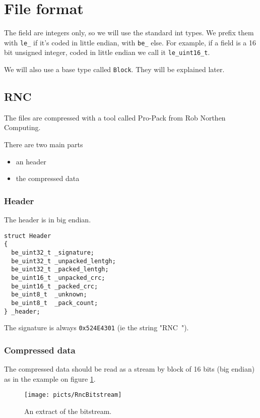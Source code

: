 \documentclass[a4paper,twoside,12pt,dvips]{article}
\begin{document}
\section{File format}
\label{sec:fileformat}

The field are integers only, so we will use the standard int types. We prefix them with \texttt{le\_} if it's coded in little endian, with \texttt{be\_} else. For example, if a field is a 16 bit unsigned integer, coded in little endian we call it \texttt{le\_uint16\_t}.

We will also use a base type called \texttt{Block}. They will be explained later. 

\subsection{RNC }
\label{sec:rnc}

The files are compressed with a tool called Pro-Pack from Rob Northen Computing.

There are two main parts 
\begin{itemize}
\item an header
\item the compressed data
\end{itemize}

\subsubsection{Header}
\label{sec:rnc_header}
The header is in big endian.

\begin{lstlisting}
struct Header
{
  be_uint32_t _signature;
  be_uint32_t _unpacked_lentgh;
  be_uint32_t _packed_lentgh;
  be_uint16_t _unpacked_crc;
  be_uint16_t _packed_crc;
  be_uint8_t  _unknown;
  be_uint8_t  _pack_count;
} _header;
\end{lstlisting}

The signature is always \texttt{0x524E4301} (ie the string "RNC~").

\subsubsection{Compressed data}
\label{sec:rnc_comp_data}

The compressed data should be read as a stream by block of 16 bits (big endian) as in the example on figure \ref{fig:rncbitstream}.

\begin{figure}[htbp]
  \texttt{[image: picts/RncBitstream]}\centering 
  \caption{An extract of the bitstream.}
  \label{fig:rncbitstream}
\end{figure}
\end{document}
